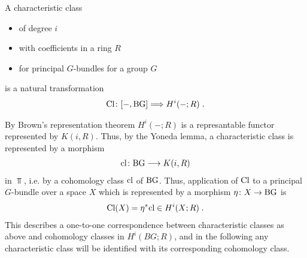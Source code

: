 \begin{Def}
  A characteristic class
  \begin{itemize}
  \item of degree $i$
  \item with coefficients in a ring $R$
  \item for principal $G$-bundles for a group $G$
  \end{itemize}
  is a natural transformation
  \begin{gather*}
    \text{Cl}\colon [-, \text{BG}] \Longrightarrow H^i(-; R)\;.
  \end{gather*}
\end{Def}
  
\begin{Rem}
  By Brown's representation theorem %
  $H^i(-;R)$ is a represantable functor represented by $K(i,R)$.
  Thus, by the Yoneda lemma, a characteristic class is
  represented by a morphism
  \begin{gather*}
    \text{cl}\colon \text{BG} \longrightarrow K(i, R)
  \end{gather*}
  in $\Top$, i.e. by a cohomology class $\text{cl}$ of $\text{BG}$.
  Thus, application of $\text{Cl}$ to a principal $G$-bundle over a
  space $X$ which is represented by a morphism $\eta\colon X\to\text{BG}$ %
  is
  \begin{gather*}
    \text{Cl}(X) = {\eta}^* \text{cl} \in H^i(X;R)
    \;.
  \end{gather*}
  This describes a one-to-one correspondence between
  characteristic classes as above and cohomology classes in
  $H^i(BG;R)$, and in the following any characteristic class will be
  identified with its corresponding cohomology class.
\end{Rem}

\begin{Rem}
\end{Rem}

